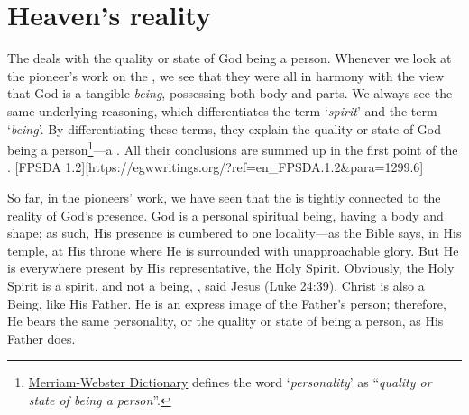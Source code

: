 \chapter{Heaven's reality}

The  deals with the quality or state of God being a person. Whenever we look at the pioneer's work on the , we see that they were all in harmony with the view that God is a tangible \textit{being}, possessing both body and parts. We always see the same underlying reasoning, which differentiates the term ‘\textit{spirit}’ and the term ‘\textit{being}’. By differentiating these terms, they explain the quality or state of God being a person\footnote{\href{https://www.merriam-webster.com/dictionary/personality}{Merriam-Webster Dictionary} defines the word ‘\textit{personality}’ as “\textit{quality or state of being a person}”.}—a . All their conclusions are summed up in the first point of the . [FPSDA 1.2][https://egwwritings.org/?ref=en\_FPSDA.1.2&para=1299.6]

So far, in the pioneers’ work, we have seen that the  is tightly connected to the reality of God’s presence. God is a personal spiritual being, having a body and shape; as such, His presence is cumbered to one locality—as the Bible says, in His temple, at His throne where He is surrounded with unapproachable glory. But He is everywhere present by His representative, the Holy Spirit. Obviously, the Holy Spirit is a spirit, and not a being, , said Jesus (Luke 24:39). Christ is also a Being, like His Father. He is an express image of the Father’s person; therefore, He bears the same personality, or the quality or state of being a person, as His Father does.

